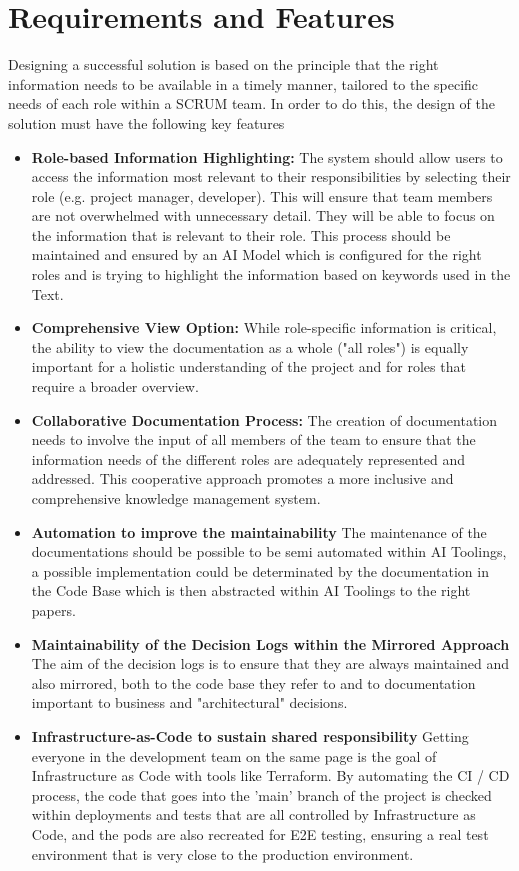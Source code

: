 \section{Requirements and Features}

Designing a successful solution is based on the principle that the right information needs to be available in a timely manner, tailored to the specific needs of each role within a SCRUM team. In order to do this, the design of the solution must have the following key features

\begin{itemize}
    \item \textbf{Role-based Information Highlighting:} The system should allow users to access the information most relevant to their responsibilities by selecting their role (e.g. project manager, developer). This will ensure that team members are not overwhelmed with unnecessary detail. They will be able to focus on the information that is relevant to their role. This process should be maintained and ensured by an AI Model which is configured for the right roles and is trying to highlight the information based on keywords used in the Text.
    \item \textbf{Comprehensive View Option:} While role-specific information is critical, the ability to view the documentation as a whole ("all roles") is equally important for a holistic understanding of the project and for roles that require a broader overview.
    \item \textbf{Collaborative Documentation Process:} The creation of documentation needs to involve the input of all members of the team to ensure that the information needs of the different roles are adequately represented and addressed. This cooperative approach promotes a more inclusive and comprehensive knowledge management system.
    \item \textbf{Automation to improve the maintainability} The maintenance of the documentations should be
    possible to be semi automated within AI Toolings, a possible implementation could be determinated by the documentation in the Code Base which is then abstracted within AI Toolings to the right papers.
    \item \textbf{Maintainability of the Decision Logs within the Mirrored Approach} The aim of the decision logs is to ensure that they are always maintained and also mirrored, both to the code base they refer to and to documentation important to business and "architectural" decisions.
    \item \textbf{Infrastructure-as-Code to sustain shared responsibility} Getting everyone in the development team on the same page is the goal of Infrastructure as Code with tools like Terraform. By automating the CI / CD process, the code that goes into the 'main' branch of the project is checked within deployments and tests that are all controlled by Infrastructure as Code, and the pods are also recreated for E2E testing, ensuring a real test environment that is very close to the production environment.
\end{itemize}




